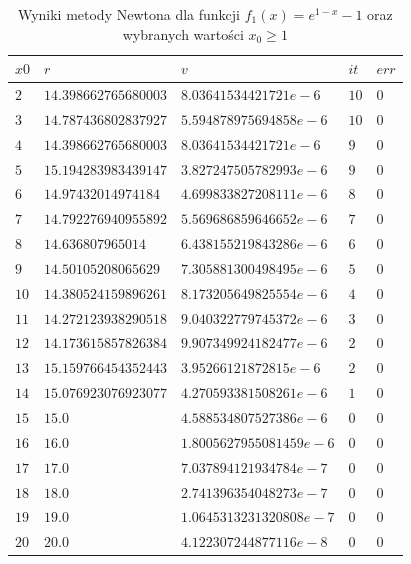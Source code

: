 \documentclass[11pt]{article}
\begin{document}
        \begin{table}[h!]
        \centering
        \begin{tabularx}{0.625\textwidth}{l l l l l }
            \hline
            $x0$ & $r$ & $v$ & $it$ & $err$ \\
            \hline
            $2$ & $14.398662765680003$ & $8.03641534421721e-6$ & $10$ & $0$ \\
            $3$ & $14.787436802837927$ & $5.594878975694858e-6$ & $10$ & $0$ \\
            $4$ & $14.398662765680003$ & $8.03641534421721e-6$ & $9$ & $0$ \\
            $5$ & $15.194283983439147$ & $3.827247505782993e-6$ & $9$ & $0$ \\
            $6$ & $14.97432014974184$ & $4.699833827208111e-6$ & $8$ & $0$ \\
            $7$ & $14.792276940955892$ & $5.569686859646652e-6$ & $7$ & $0$ \\
            $8$ & $14.636807965014$ & $6.438155219843286e-6$ & $6$ & $0$ \\
            $9$ & $14.50105208065629$ & $7.305881300498495e-6$ & $5$ & $0$ \\
            $10$ & $14.380524159896261$ & $8.173205649825554e-6$ & $4$ & $0$ \\
            $11$ & $14.272123938290518$ & $9.040322779745372e-6$ & $3$ & $0$ \\
            $12$ & $14.173615857826384$ & $9.907349924182477e-6$ & $2$ & $0$ \\
            $13$ & $15.159766454352443$ & $3.95266121872815e-6$ & $2$ & $0$ \\
            $14$ & $15.076923076923077$ & $4.270593381508261e-6$ & $1$ & $0$ \\
            $15$ & $15.0$ & $4.588534807527386e-6$ & $0$ & $0$ \\
            $16$ & $16.0$ & $1.8005627955081459e-6$ & $0$ & $0$ \\
            $17$ & $17.0$ & $7.037894121934784e-7$ & $0$ & $0$ \\
            $18$ & $18.0$ & $2.741396354048273e-7$ & $0$ & $0$ \\
            $19$ & $19.0$ & $1.0645313231320808e-7$ & $0$ & $0$ \\
            $20$ & $20.0$ & $4.122307244877116e-8$ & $0$ & $0$ \\
            \hline
        \end{tabularx}
        \label{table:ex6_newton_f2}
        \caption{Wyniki metody Newtona dla funkcji $f_1(x) = e^{1 - x} - 1$ oraz wybranych wartości $x_0 \geq 1$}
        \end{table}     
        
\end{document}
